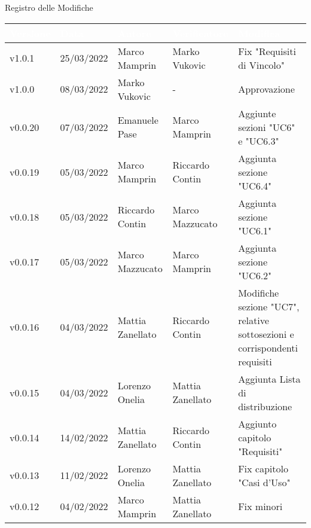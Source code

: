 \begin{center}
  \huge{Registro delle Modifiche}
\end{center}

\renewcommand\arraystretch{1,5}
{\centering
\begin{longtable}{|C{1.8cm}|C{2.1cm}|C{2cm}|C{2.4cm}|L{4.4cm}|}
  \hline
  \textcolor[HTML]{FFFFFF}{\textbf{Versione}} & \textcolor[HTML]{FFFFFF}{\textbf{Data}} & \textcolor[HTML]{FFFFFF}{\textbf{Autore}}  & \textcolor[HTML]{FFFFFF}{\textbf{Verificatore}} & \textcolor[HTML]{FFFFFF}{\textbf{Modifica}}    \\ \hline
  v1.0.1           & 25/03/2022   & Marco Mamprin & Marko Vukovic & Fix "Requisiti di Vincolo"     \\ \hline
  v1.0.0           & 08/03/2022   & Marko Vukovic & - & Approvazione     \\ \hline
  v0.0.20           & 07/03/2022    & Emanuele Pase  & Marco Mamprin         & Aggiunte sezioni "UC6" e "UC6.3" \\ \hline
  v0.0.19           & 05/03/2022    & Marco Mamprin  &  Riccardo Contin   & Aggiunta sezione "UC6.4"                   \\ \hline
  v0.0.18           & 05/03/2022    & Riccardo Contin &  Marco Mazzucato    & Aggiunta sezione "UC6.1" \\ \hline
  v0.0.17           & 05/03/2022    & Marco Mazzucato  & Marco Mamprin     & Aggiunta sezione "UC6.2"   \\ \hline
  v0.0.16           & 04/03/2022    & Mattia Zanellato &  Riccardo Contin      & Modifiche sezione "UC7", relative sottosezioni e corrispondenti requisiti \\ \hline
  v0.0.15       & 04/03/2022    & Lorenzo Onelia  & Mattia Zanellato     & Aggiunta Lista di distribuzione                  \\ \hline
  v0.0.14           & 14/02/2022    & Mattia Zanellato  & Riccardo Contin     & Aggiunto capitolo "Requisiti"                   \\ \hline
  v0.0.13           & 11/02/2022    & Lorenzo Onelia    & Mattia Zanellato    & Fix capitolo "Casi d'Uso"                       \\ \hline
  v0.0.12           & 04/02/2022    & Marco Mamprin     & Mattia Zanellato    & Fix minori                                      \\ \hline

\end{longtable}}

